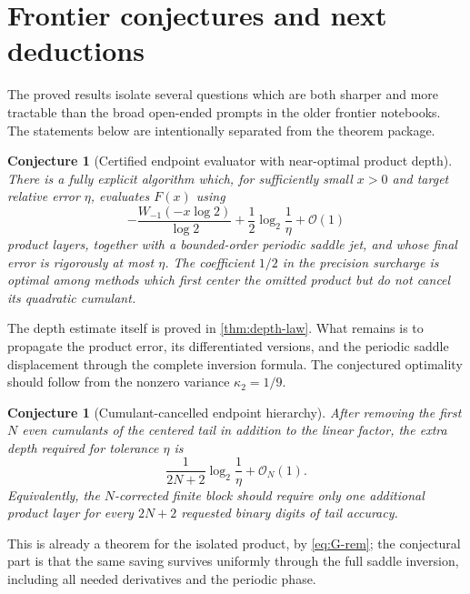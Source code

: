 \documentclass[11pt,oneside]{article}
\numberwithin{equation}{section}
\newtheorem{conjecture}[theorem]{Conjecture}
\theoremstyle{definition}
\theoremstyle{remark}
\newcommand{\bigO}{\mathcal O}
\begin{document}
\section{Frontier conjectures and next deductions}
\label{sec:frontiers}

The proved results isolate several questions which are both sharper and more tractable than
the broad open-ended prompts in the older frontier notebooks.  The statements below are
intentionally separated from the theorem package.

\begin{conjecture}[Certified endpoint evaluator with near-optimal product depth]
\label{conj:endpoint-evaluator}
There is a fully explicit algorithm which, for sufficiently small $x>0$ and target relative
error $\eta$, evaluates $F(x)$ using
\begin{equation}
 -\frac{W_{-1}(-x\log2)}{\log2}
 +\frac12\log_2\frac1\eta+\bigO(1)
 \label{eq:conj-depth}
\end{equation}
product layers, together with a bounded-order periodic saddle jet, and whose final error is
rigorously at most $\eta$.  The coefficient $1/2$ in the precision surcharge is optimal among
methods which first center the omitted product but do not cancel its quadratic cumulant.
\end{conjecture}

The depth estimate itself is proved in \cref{thm:depth-law}.  What remains is to propagate the
product error, its differentiated versions, and the periodic saddle displacement through the
complete inversion formula.  The conjectured optimality should follow from the nonzero
variance $\kappa_2=1/9$.

\begin{conjecture}[Cumulant-cancelled endpoint hierarchy]
\label{conj:cumulant-depth}
After removing the first $N$ even cumulants of the centered tail in addition to the linear
factor, the extra depth required for tolerance $\eta$ is
\begin{equation}
 \frac{1}{2N+2}\log_2\frac1\eta+\bigO_N(1).
 \label{eq:cumulant-depth-conj}
\end{equation}
Equivalently, the $N$-corrected finite block should require only one additional product layer
for every $2N+2$ requested binary digits of tail accuracy.
\end{conjecture}

This is already a theorem for the isolated product, by \eqref{eq:G-rem}; the conjectural part
is that the same saving survives uniformly through the full saddle inversion, including all
needed derivatives and the periodic phase.
\end{document}
